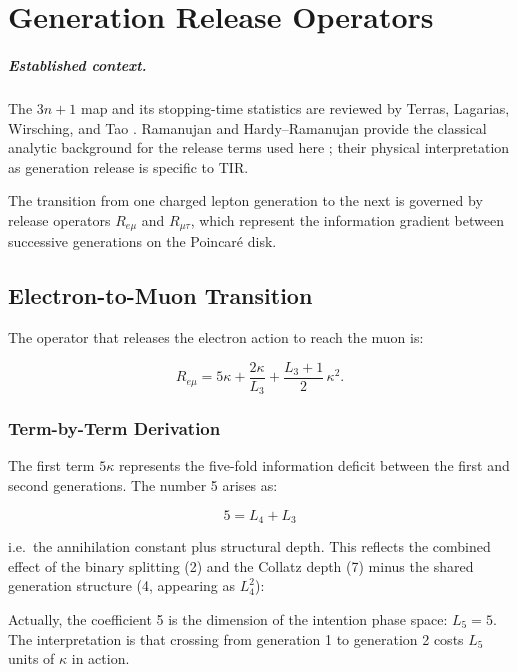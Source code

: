 \chapter{Generation Release Operators}
\label{ch:generation_release}


\paragraph{Established context.}
The $3n+1$ map and its stopping-time statistics are reviewed by Terras, Lagarias,
Wirsching, and Tao \cite{Terras1976,Lagarias1985,Wirsching1998,Tao2022Collatz}.
Ramanujan and Hardy--Ramanujan provide the classical analytic background for the
release terms used here \cite{Ramanujan1918,HardyRamanujan1918}; their physical
interpretation as generation release is specific to TIR.

The transition from one charged lepton generation to the next is governed by
release operators \(R_{e\mu}\) and \(R_{\mu\tau}\), which represent the
information gradient between successive generations on the Poincar\'{e} disk.

\section{Electron-to-Muon Transition}

The operator that releases the electron action to reach the muon is:

\begin{equation}
R_{e\mu} = 5\kappa + \frac{2\kappa}{L_3} + \frac{L_3+1}{2}\,\kappa^2.
\label{eq:Rem}
\end{equation}

\subsection{Term-by-Term Derivation}

The first term \(5\kappa\) represents the five-fold information deficit
between the first and second generations.  The number 5 arises as:

\[
5 = L_4 + L_3
\]

i.e.\ the annihilation constant plus structural depth.  This reflects the
combined effect of the binary splitting (2) and the Collatz depth (7) minus
the shared generation structure (4, appearing as \(L_4^2\)):

Actually, the coefficient 5 is the dimension of the intention phase space:
\(L_5 = 5\).  The interpretation is that crossing from generation 1 to
generation 2 costs \(L_5\) units of \(\kappa\) in action.

